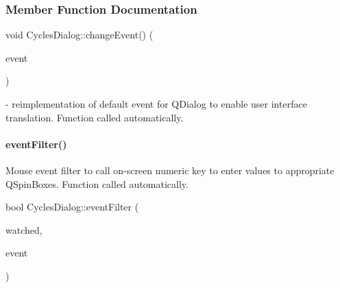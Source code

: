 \subsubsection{Member Function Documentation}
\mbox{\label{classCyclesDialog_a3d1b7bb4af1e286adadf2483cb0e4dfe}} 
{\footnotesize\ttfamily void Cycles\+Dialog\+::\texorpdfstring{change\+Event()}{changeEvent()} (\begin{DoxyParamCaption}\item[{Q\+Event $\ast$}]{event }\end{DoxyParamCaption}){\ttfamily [protected]}} - reimplementation of default event for QDialog to enable user interface translation. Function called automatically.

\mbox{\label{classCyclesDialog_a5a20052e29f7530886dded1e06bc5afd}} 
\paragraph{\texorpdfstring{event\+Filter()}{eventFilter()}}
Mouse event filter to call on-screen numeric key to enter values to appropriate QSpinBoxes. Function called automatically.\\
{\footnotesize\ttfamily bool Cycles\+Dialog\+::event\+Filter (\begin{DoxyParamCaption}\item[{Q\+Object $\ast$}]{watched,  }\item[{Q\+Event $\ast$}]{event }\end{DoxyParamCaption}){\ttfamily [protected]}}

\mbox{\label{classCyclesDialog_ad25bef71c8a2219252c1458fa333a376}} 
